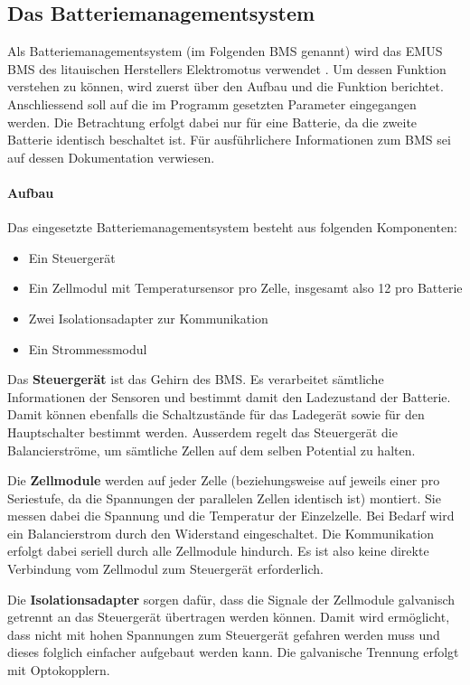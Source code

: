 \subsection{Das Batteriemanagementsystem}

Als Batteriemanagementsystem (im Folgenden BMS genannt) wird das EMUS BMS des litauischen Herstellers Elektromotus verwendet \cite{emus}. Um dessen Funktion verstehen zu können, wird zuerst über den Aufbau und die Funktion berichtet. Anschliessend soll auf die im Programm gesetzten Parameter eingegangen werden. Die Betrachtung erfolgt dabei nur für eine Batterie, da die zweite Batterie identisch beschaltet ist. Für ausführlichere Informationen zum BMS sei auf dessen Dokumentation \cite{bms} verwiesen.

\paragraph{Aufbau}
Das eingesetzte Batteriemanagementsystem besteht aus folgenden Komponenten: \begin{itemize}
	\item Ein Steuergerät
	\item Ein Zellmodul mit Temperatursensor pro Zelle, insgesamt also 12 pro Batterie
	\item Zwei Isolationsadapter zur Kommunikation
	\item Ein Strommessmodul
\end{itemize}

Das \textbf{Steuergerät} ist das Gehirn des BMS. Es verarbeitet sämtliche Informationen der Sensoren und bestimmt damit den Ladezustand der Batterie. Damit können ebenfalls die Schaltzustände für das Ladegerät sowie für den Hauptschalter bestimmt werden. Ausserdem regelt das Steuergerät die Balancierströme, um sämtliche Zellen auf dem selben Potential zu halten.

Die \textbf{Zellmodule} werden auf jeder Zelle (beziehungsweise auf jeweils einer pro Seriestufe, da die Spannungen der parallelen Zellen identisch ist) montiert. Sie messen dabei die Spannung und die Temperatur der Einzelzelle. Bei Bedarf wird ein Balancierstrom durch den Widerstand eingeschaltet. Die Kommunikation erfolgt dabei seriell durch alle Zellmodule hindurch. Es ist also keine direkte Verbindung vom Zellmodul zum Steuergerät erforderlich.

Die \textbf{Isolationsadapter} sorgen dafür, dass die Signale der Zellmodule galvanisch getrennt an das Steuergerät übertragen werden können. Damit wird ermöglicht, dass nicht mit hohen Spannungen zum Steuergerät gefahren werden muss und dieses folglich einfacher aufgebaut werden kann. Die galvanische Trennung erfolgt mit Optokopplern.

